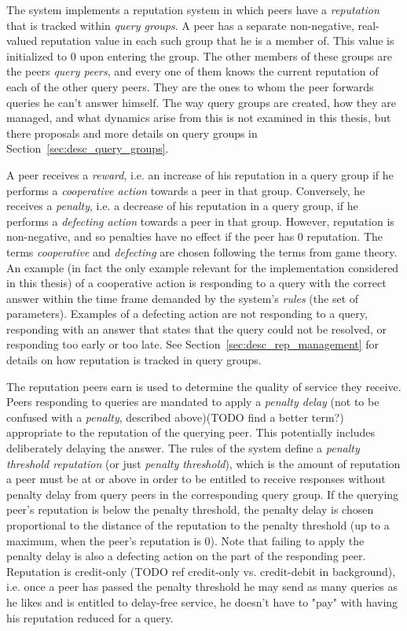 The system implements a reputation system in which peers have a
\emph{reputation} that is tracked within \emph{query groups}. A peer has a
separate non-negative, real-valued reputation value in each such group that he
is a member of. This value is initialized to 0 upon entering the group. The
other members of these groups are the peers \emph{query peers}, and every one of
them knows the current reputation of each of the other query peers. They are the
ones to whom the peer forwards queries he can't answer himself. The way query
groups are created, how they are managed, and what dynamics arise from this is
not examined in this thesis, but there proposals and more details on query
groups in Section~\ref{sec:desc_query_groups}.

A peer receives a \emph{reward}, i.e. an increase of his reputation in a query
group if he performs a \emph{cooperative action} towards a peer in that group.
Conversely, he receives a \emph{penalty}, i.e. a decrease of his reputation in a
query group, if he performs a \emph{defecting action} towards a peer in that
group. However, reputation is non-negative, and so penalties have no effect if
the peer has 0 reputation. The terms \emph{cooperative} and \emph{defecting} are
chosen following the terms from game theory. An example (in fact the only
example relevant for the implementation considered in this thesis) of a
cooperative action is responding to a query with the correct answer within the
time frame demanded by the system's \emph{rules} (the set of parameters).
Examples of a defecting action are not responding to a query, responding with an
answer that states that the query could not be resolved, or responding too early
or too late. See Section~\ref{sec:desc_rep_management} for details on how
reputation is tracked in query groups.

The reputation peers earn is used to determine the quality of service they
receive. Peers responding to queries are mandated to apply a \emph{penalty
delay} (not to be confused with a \emph{penalty}, described above)(TODO find a
better term?) appropriate to the reputation of the querying peer. This
potentially includes deliberately delaying the answer. The rules of the system
define a \emph{penalty threshold reputation} (or just \emph{penalty threshold}),
which is the amount of reputation a peer must be at or above in order to be
entitled to receive responses without penalty delay from query peers in the
corresponding query group. If the querying peer's reputation is below the
penalty threshold, the penalty delay is chosen proportional to the distance of
the reputation to the penalty threshold (up to a maximum, when the peer's
reputation is 0). Note that failing to apply the penalty delay is also a
defecting action on the part of the responding peer. Reputation is credit-only
(TODO ref credit-only vs. credit-debit in background), i.e. once a peer has
passed the penalty threshold he may send as many queries as he likes and is
entitled to delay-free service, he doesn't have to "pay" with having his
reputation reduced for a query.

